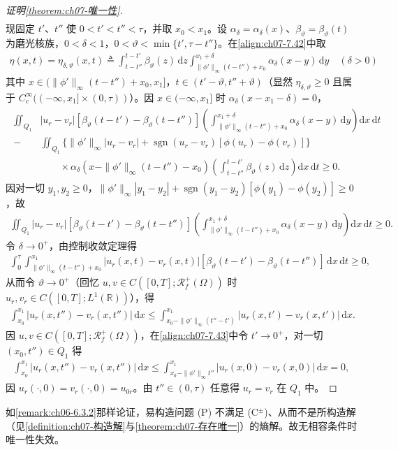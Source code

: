 \documentclass[../../main.tex]{subfiles}%
\begin{document}
\begin{proof}[证明\cref{theorem:ch07-唯一性}]
\begin{align}
\end{align}
现固定 $t'$、$t''$ 使 $0<t'<t''<\tau$，并取 $x_0<x_1$。设 $\alpha_\delta=\alpha_\delta(x)$、$\beta_\vartheta=\beta_\vartheta(t)$ 为磨光核族，$0<\delta<1$，$0<\vartheta<\min\{t',\tau-t''\}$。在\eqref{align:ch07-7.42}中取
\begin{align*}
\eta(x,t)=\eta_{\delta,\vartheta}(x,t)\triangleq \int_{t-t''}^{t-t'}\beta_\vartheta(z)\,\mathrm{d}z\int_{\|\phi'\|_\infty(t-t'')+x_0}^{x_1+\delta}\alpha_\delta(x-y)\,\mathrm{d}y\quad(\delta>0)
\end{align*}
其中 $x\in(\|\phi'\|_\infty(t-t'')+x_0,x_1]$，$t\in(t'-\vartheta,t''+\vartheta)$（显然 $\eta_{\delta,\vartheta}\geqslant0$ 且属于 $C^\infty_c((-\infty,x_1]\times(0,\tau))$）。因 $x\in(-\infty,x_1]$ 时 $\alpha_\delta(x-x_1-\delta)=0$，
\begin{align*}
\begin{aligned}
\iint_{Q_1}&|u_r-v_r|[\beta_\vartheta(t-t')-\beta_\vartheta(t-t'')]\left(\int_{\|\phi'\|_\infty(t-t'')+x_0}^{x_1+\delta}\alpha_\delta(x-y)\,\mathrm{d}y\right)\mathrm{d}x\,\mathrm{d}t\\
-&\iint_{Q_1}\{\|\phi'\|_\infty|u_r-v_r|+\operatorname{sgn}(u_r-v_r)[\phi(u_r)-\phi(v_r)]\}\\
&\qquad\times\alpha_\delta(x-\|\phi'\|_\infty(t-t'')-x_0)\left(\int_{t-t''}^{t-t'}\beta_\vartheta(z)\,\mathrm{d}z\right)\mathrm{d}x\,\mathrm{d}t\geqslant0.
\end{aligned}
\end{align*}
因对一切 $y_1,y_2\geqslant0$，$\|\phi'\|_\infty|y_1-y_2|+\operatorname{sgn}(y_1-y_2)[\phi(y_1)-\phi(y_2)]\geqslant0$，故
\begin{align*}
\iint_{Q_1}|u_r-v_r|[\beta_\vartheta(t-t')-\beta_\vartheta(t-t'')]\left(\int_{\|\phi'\|_\infty(t-t'')+x_0}^{x_1+\delta}\alpha_\delta(x-y)\,\mathrm{d}y\right)\mathrm{d}x\,\mathrm{d}t\geqslant0.
\end{align*}
令 $\delta\to0^+$，由控制收敛定理得
\begin{align*}
\int_0^\tau\int_{\|\phi'\|_\infty(t-t'')+x_0}^{x_1}|u_r(x,t)-v_r(x,t)|[\beta_\vartheta(t-t')-\beta_\vartheta(t-t'')]\,\mathrm{d}x\,\mathrm{d}t\geqslant0,
\end{align*}
从而令 $\vartheta\to0^+$（回忆 $u,v\in C([0,T];\mathscr{R}_f^+(\Omega))$ 时 $u_r,v_r\in C([0,T];L^1(\mathbb{R}))$），得
\begin{align}
\int_{x_0}^{x_1}|u_r(x,t'')-v_r(x,t'')|\,\mathrm{d}x
\leqslant\int_{x_0-\|\phi'\|_\infty(t''-t')}^{x_1}|u_r(x,t')-v_r(x,t')|\,\mathrm{d}x. \label{align:ch07-7.43}
\end{align}
因 $u,v\in C([0,T];\mathscr{R}_f^+(\Omega))$，在\eqref{align:ch07-7.43}中令 $t'\to0^+$，对一切 $(x_0,t'')\in Q_1$ 得
\begin{align*}
\int_{x_0}^{x_1}|u_r(x,t'')-v_r(x,t'')|\,\mathrm{d}x
\leqslant\int_{x_0-\|\phi'\|_\infty t''}^{x_1}|u_r(x,0)-v_r(x,0)|\,\mathrm{d}x=0,
\end{align*}
因 $u_r(\cdot,0)=v_r(\cdot,0)=u_{0r}$。由 $t''\in(0,\tau)$ 任意得 $u_r=v_r$ 在 $Q_1$ 中。
\end{proof}

\begin{remark}\label{remark:ch07-7.2.6}
如\cref{remark:ch06-6.3.2}那样论证，易构造问题 (P) 不满足 (C$^\pm$)、从而不是所构造解（见\cref{definition:ch07-构造解}与\cref{theorem:ch07-存在唯一}）的熵解。故无相容条件时唯一性失效。
\end{remark}
\end{document}
